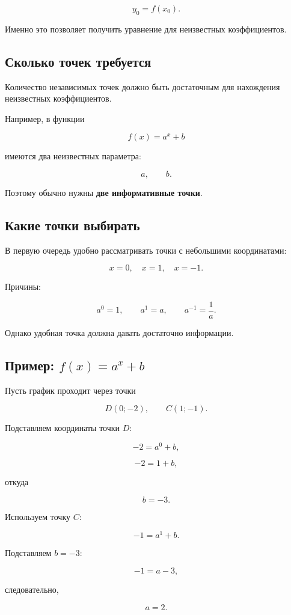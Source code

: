 \documentclass[a4paper,12pt]{article}
\newcommand{\important}[1]{\textbf{\color{darkaccent}#1}}
\begin{document}
\[
y_0=f(x_0).
\]

Именно это позволяет получить уравнение для неизвестных коэффициентов.

\subsection{Сколько точек требуется}

Количество независимых точек должно быть достаточным для нахождения неизвестных коэффициентов.

Например, в функции

\[
f(x)=a^x+b
\]

имеются два неизвестных параметра:

\[
a,\qquad b.
\]

Поэтому обычно нужны \important{две информативные точки}.

\subsection{Какие точки выбирать}

В первую очередь удобно рассматривать точки с небольшими координатами:

\[
x=0,\quad x=1,\quad x=-1.
\]

Причины:

\[
a^0=1,
\qquad
a^1=a,
\qquad
a^{-1}=\frac1a.
\]

Однако удобная точка должна давать достаточно информации.

\subsection{Пример: \(f(x)=a^x+b\)}

Пусть график проходит через точки

\[
D(0;-2),
\qquad
C(1;-1).
\]

Подставляем координаты точки \(D\):

\[
-2=a^0+b,
\]

\[
-2=1+b,
\]

откуда

\[
b=-3.
\]

Используем точку \(C\):

\[
-1=a^1+b.
\]

Подставляем \(b=-3\):

\[
-1=a-3,
\]

следовательно,

\[
a=2.
\]
\end{document}
